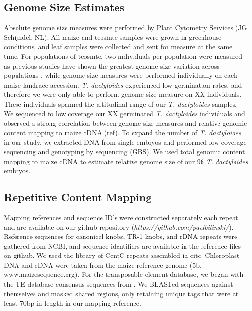 \documentclass[10pt]{article}
\begin{document}
\subsection*{Genome Size Estimates}
Absolute genome size measures were performed by Plant Cytometry Services (JG Schijndel, NL).
All maize and teosinte samples were grown in greenhouse conditions, and leaf samples were collected and sent for measure at the same time.
For populations of teosinte, two individuals per population were measured as previous studies have shown the greatest genome size variation across populations \cite{diez2013genome}, while genome size measures were performed individually on each maize landrace accession.
\emph{T. dactyloides} experienced low germination rates, and therefore we were only able to perform genome size measure on XX individuals.
These individuals spanned the altitudinal range of our \emph{T. dactyloides} samples.
We sequenced to low coverage our XX germinated \emph{T. dactyloides} individuals and observed a strong correlation between genome size measures and relative genomic content mapping to maize cDNA (ref{}).
To expand the number of \emph{T. dactyloides} in our study, we extracted DNA from single embryos and performed low coverage sequencing and genotyping by sequencing (GBS).
We used total genomic content mapping to maize cDNA to estimate relative genome size of our 96 \emph{T. dactyloides} embryos.

\subsection*{Repetitive Content Mapping}

Mapping references and sequence ID's were constructed separately each repeat and are available on our github repository (\emph{https://github.com/paulbilinski/}). %
Reference sequences for canonical knobs, TR-1 knobs, and rDNA repeats were gathered from NCBI, and sequence identifiers are available in the reference files on github.
We used the library of CentC repeats assembled in cite{}.
Chloroplast DNA and cDNA were taken from the maize reference genome (5b, www.maizesequence.org).
For the transposable element database, we began with the TE database consensus sequences from \cite{baucom2009exceptional}.
We BLASTed sequences against themselves and masked shared regions, only retaining unique tags that were at least 70bp in length in our mapping reference.
\end{document}
